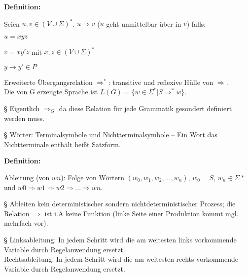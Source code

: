 \documentclass[11pt,
			a4paper,
			parskip=full,
			toc=bib,
			toc=idx,
			toc=listof,
			ngerman
			listof=totoc,]{scrartcl}
\newcommand{\concept}[1]{%
	\sf{%
		\textbf{%
				\textcolor{mymauve}{#1}%
		}%
	}%
	\rm%
}
\newenvironment{objDef}[1]%
{	\begin{framed}
	\textbf{Definition:} \concept{#1}
	\compress}%
{\end{framed}}
\newenvironment{cmt}%
{\color{mygray} § }
{\color{black}}
\newcommand{\compress}{\vspace{-1em}}
\begin{document}
\compress
\compress
\begin{objDef}{Übergangsrelation (für Grammatiken)}

Seien $u,v ∈ (V ∪ Σ)^*$.
$u ⇒ v$ ($u$ geht unmittelbar über in $v$) falls:
\compress
\begin{compactitem}
  \item $u = xyz$
  \item $v = xy'z$ mit $x,z ∈ (V ∪ Σ)^*$
  \item $y → y' ∈ P$
\end{compactitem}
\compress
Erweiterte Übergangsrelation $⇒^*$: transitive und reflexive Hülle von $⇒$.\\
Die von G erzeugte Sprache ist $L(G) = \{ w ∈ Σ^* | S ⇒^* w \}$.

\end{objDef}
\compress
\compress
\begin{cmt}
Eigentlich $⇒_G$ da diese Relation für jede Grammatik gesondert definiert werden muss.
\end{cmt}

\compress
\begin{cmt}
Wörter: Terminalsymbole und Nichtterminalsymbole -- Ein Wort das Nichtterminale enthält heißt Satzform.
\end{cmt}

\compress
\begin{objDef}{Ableitung}

Ableitung (von $wn$): Folge von Wörtern $(w_0, w_1,w_2,...,w_n)$, $w_0 = S$, $w_n ∈ Σ*$ und
$w0 ⇒ w1 ⇒ w2 ⇒ ... ⇒ wn$.

\end{objDef}
\compress
\compress
\begin{cmt}
Ableiten kein deterministischer sondern nichtdeterministischer Prozess;
die Relation $⇒$ ist i.A keine Funktion (linke Seite einer Produktion kommt mgl. mehrfach vor).
\end{cmt}

\compress
\begin{cmt}
Linksableitung: In jedem Schritt wird die am weitesten links vorkommende Variable durch Regelanwendung ersetzt.\\
Rechtsableitung: In jedem Schritt wird die am weitesten rechts vorkommende Variable durch Regelanwendung ersetzt.
\end{cmt}


\end{document}
